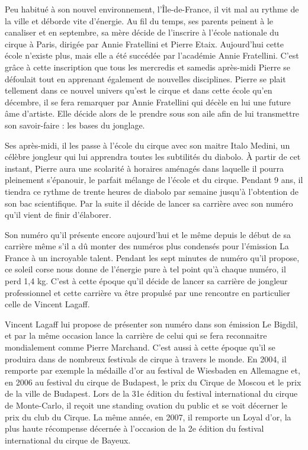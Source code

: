 Peu habitué à son nouvel environnement, l'Île-de-France, il vit mal au rythme de la ville et déborde vite d'énergie. Au fil du temps, ses parents peinent à le canaliser et en septembre, sa mère décide de l'inscrire à l'école nationale du cirque à Paris, dirigée par Annie Fratellini et Pierre Etaix. Aujourd'hui cette école n'existe plus, mais elle a été succédée par l'académie Annie Fratellini. C'est grâce à cette inscription que tous les mercredis et samedis après-midi Pierre se défoulait tout en apprenant également de nouvelles disciplines. Pierre se plait tellement dans ce nouvel univers qu'est le cirque et dans cette école qu'en décembre, il se fera remarquer par Annie Fratellini qui décèle en lui une future âme d'artiste. Elle décide alors de le prendre sous son aile afin de lui transmettre son savoir-faire : les bases du jonglage.

Ses après-midi, il les passe à l'école du cirque avec son maitre Italo Medini, un célèbre jongleur qui lui apprendra toutes les subtilités du diabolo. À partir de cet instant, Pierre aura une scolarité à horaires aménagés dans laquelle il pourra pleinement s'épanouir, le parfait mélange de l'école et du cirque. Pendant 9 ans, il tiendra ce rythme de trente heures de diabolo par semaine jusqu'à l'obtention de son bac scientifique. Par la suite il décide de lancer sa carrière avec son numéro qu’il vient de finir d'élaborer.

Son numéro qu'il présente encore aujourd'hui et le même depuis le début de sa carrière même s'il a dû monter des numéros plus condensés pour l'émission La France à un incroyable talent. Pendant les sept minutes de numéro qu'il propose, ce soleil corse nous donne de l'énergie pure à tel point qu'à chaque numéro, il perd 1,4 kg. C'est à cette époque qu'il décide de lancer sa carrière de jongleur professionnel et cette carrière va être propulsé par une rencontre en particulier celle de Vincent Lagaff.

Vincent Lagaff lui propose de présenter son numéro dans son émission Le Bigdil, et par la même occasion lance la carrière de celui qui se fera reconnaitre mondialement comme Pierre Marchand. C'est aussi à cette époque qu'il se produira dans de nombreux festivals de cirque à travers le monde. En 2004, il remporte par exemple la médaille d'or au festival de Wiesbaden en Allemagne et, en 2006 au festival du cirque de Budapest, le prix du Cirque de Moscou et le prix de la ville de Budapest. Lors de la 31e édition du festival international du cirque de Monte-Carlo, il reçoit une standing ovation du public et se voit décerner le prix du club du Cirque. La même année, en 2007, il remporte un Loyal d'or, la plus haute récompense décernée à l'occasion de la 2e édition du festival international du cirque de Bayeux.

